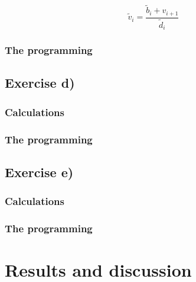 \documentclass{article}
\begin{document}
    \begin{equation*}
      \tilde{v}_i = \frac{\tilde{b}_i + v_{i+1}}{\tilde{d}_i}
    \end{equation*}

    \subsubsection{The programming}




  \subsection{Exercise d)}




    \subsubsection{Calculations}




    \subsubsection{The programming}




  \subsection{Exercise e)}




    \subsubsection{Calculations}




    \subsubsection{The programming}








\vspace{1cm}

\section{Results and discussion}
\end{document}
